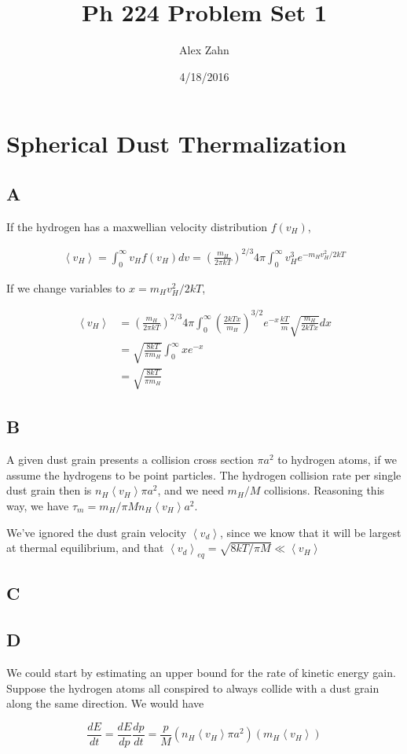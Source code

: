 \documentclass[12pt]{article}
\title{Ph 224 Problem Set 1}
\author{Alex Zahn}
\date{4/18/2016}
\newcommand{\av}[1]{\left\langle #1 \right\rangle}
\begin{document}
\maketitle

\section{Spherical Dust Thermalization}

\subsection*{A}

If the hydrogen has a maxwellian velocity distribution \(f(v_H)\),

\begin{align*}
\av{v_H}=\int_0^\infty v_Hf(v_H)dv= \left( \frac{m_H}{2\pi kT}\right)^{2/3}4\pi\int_0^\infty v_H^3 e^{-m_Hv_H^2/2kT}
\end{align*}

If we change variables to \(x=m_Hv_H^2/2kT\),

\begin{align*}
\av{v_H} &= \left( \frac{m_H}{2\pi kT}\right)^{2/3}4\pi\int_0^\infty \left(\frac{2kTx}{m_H}\right)^{3/2}e^{-x}\frac{kT}{m}\sqrt{\frac{m_H}{2kTx}}dx \\[12pt]
&= \sqrt{\frac{8kT}{\pi m_H}}\int_0^\infty xe^{-x}\\[12pt]
&=  \sqrt{\frac{8kT}{\pi m_H}}
\end{align*}

\subsection*{B}

A given dust grain presents a collision cross section \(\pi a^2\) to hydrogen atoms, if we assume the hydrogens to be point particles. The hydrogen collision rate per single dust grain then is \(n_H \av{v_H}\pi a^2\), and we need \(m_H/M\) collisions. Reasoning this way, we have \(\tau_m = m_H/\pi M n_H\av{v_H}a^2\).

We've ignored the dust grain velocity \(\av{v_d}\), since we know that it will be largest at thermal equilibrium, and that \( \av{v_d}_{eq} =  \sqrt{8kT/\pi M} \ll \av{v_H} \)

\subsection*{C}

\subsection*{D}

We could start by estimating an upper bound for the rate of kinetic energy gain. Suppose the hydrogen atoms all conspired to always collide with a dust grain along the same direction. We would have

\[ \frac{dE}{dt} = \frac{dE}{dp}\frac{dp}{dt} = \frac{p}{M}(n_H\av{v_H}\pi a^2 )(m_H \av{v_H})
\]
\end{document}
